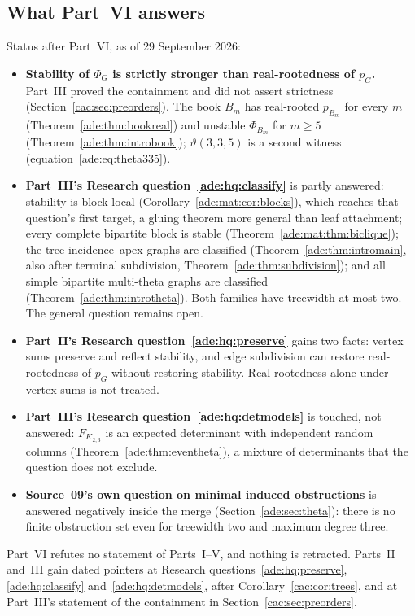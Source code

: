 \documentclass[11pt]{article}
\numberwithin{equation}{section}
\theoremstyle{definition}
\begin{document}
\subsection{What Part~VI answers}
\label{ade:sec:answers}
Status after Part~VI, as of 29 September 2026:
\begin{itemize}[leftmargin=1.4em]
\item \textbf{Stability of $\Phi_G$ is strictly stronger than
real-rootedness of $p_G$.} Part~III proved the containment and did not
assert strictness (Section~\ref{cac:sec:preorders}). The book $B_m$ has
real-rooted $p_{B_m}$ for every $m$ (Theorem~\ref{ade:thm:bookreal}) and
unstable $\Phi_{B_m}$ for $m\ge5$ (Theorem~\ref{ade:thm:introbook});
$\vartheta(3,3,5)$ is a second witness (equation~\eqref{ade:eq:theta335}).
\item \textbf{Part~III's Research question~\ref{ade:hq:classify}} is partly
answered: stability is block-local (Corollary~\ref{ade:mat:cor:blocks}), which
reaches that question's first target, a gluing theorem more general than leaf
attachment; every complete bipartite block is stable
(Theorem~\ref{ade:mat:thm:biclique}); the tree incidence--apex graphs are
classified (Theorem~\ref{ade:thm:intromain}, also after terminal subdivision,
Theorem~\ref{ade:thm:subdivision}); and all simple bipartite multi-theta
graphs are classified (Theorem~\ref{ade:thm:introtheta}). Both families have
treewidth at most two. The general question remains open.
\item \textbf{Part~II's Research question~\ref{ade:hq:preserve}} gains
two facts: vertex sums preserve and reflect stability, and edge subdivision
can restore real-rootedness of $p_G$ without restoring stability.
Real-rootedness alone under vertex sums is not treated.
\item \textbf{Part~III's Research question~\ref{ade:hq:detmodels}} is
touched, not answered: $F_{K_{2,3}}$ is an expected determinant with
independent random columns (Theorem~\ref{ade:thm:eventheta}), a mixture of
determinants that the question does not exclude.
\item \textbf{Source~09's own question on minimal induced obstructions} is
answered negatively inside the merge (Section~\ref{ade:sec:theta}): there is
no finite obstruction set even for treewidth two and maximum degree three.
\end{itemize}
Part~VI refutes no statement of Parts~I--V, and nothing is retracted. Parts~II
and~III gain dated pointers at Research questions~\ref{ade:hq:preserve},
\ref{ade:hq:classify} and~\ref{ade:hq:detmodels}, after
Corollary~\ref{cac:cor:trees}, and at Part~III's statement of the
containment in Section~\ref{cac:sec:preorders}.
\end{document}
